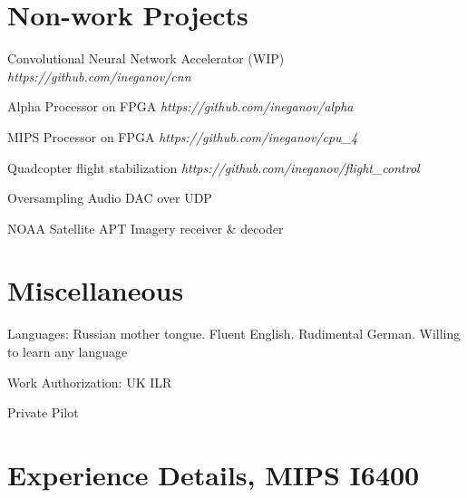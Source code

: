 \documentclass[a4paper]{scrartcl}
\begin{document}
\vspace{10pt}

\section*{Non-work Projects}
\begin{list1}
\item
  \begin{list2}
    \item Convolutional Neural Network Accelerator (WIP)                    \hfill \emph{https://github.com/ineganov/cnn}
    \item Alpha Processor on FPGA                                           \hfill \emph{https://github.com/ineganov/alpha}
    \item MIPS Processor on FPGA                                            \hfill \emph{https://github.com/ineganov/cpu\_4}
    \item Quadcopter flight stabilization                                   \hfill \emph{https://github.com/ineganov/flight\_control}
    \item Oversampling Audio DAC over UDP
    \item NOAA Satellite APT Imagery receiver \& decoder
  \end{list2}
\end{list1}

\vspace{10pt}

\section*{Miscellaneous}
\begin{list1}
\item
  \begin{list2}
  \item Languages: Russian mother tongue. Fluent English. Rudimental German. Willing to learn any language
  \item Work Authorization: UK ILR
  \item Private Pilot
  \end{list2}
\end{list1}

\newpage

\section*{Experience Details, MIPS I6400}
\end{document}
